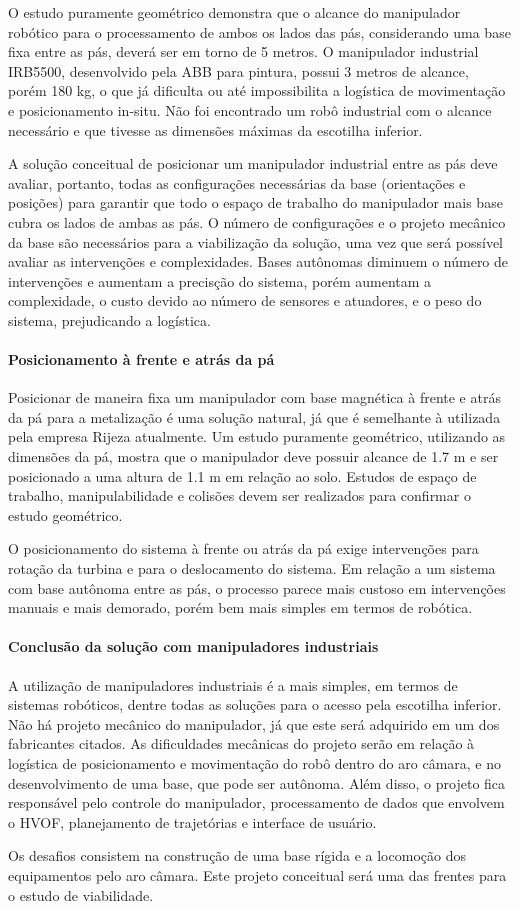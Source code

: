 O estudo puramente geométrico demonstra que o alcance do manipulador robótico
para o processamento de ambos os lados das pás, considerando uma base fixa entre
as pás, deverá ser em torno de 5 metros. O manipulador industrial IRB5500,
desenvolvido pela ABB para pintura, possui 3 metros de alcance, porém 180 kg, o que já dificulta ou até impossibilita a
logística de movimentação e posicionamento in-situ. Não foi encontrado um robô
industrial com o alcance necessário e que tivesse as dimensões máximas da
escotilha inferior. 

A solução conceitual de posicionar um manipulador industrial entre as pás deve
avaliar, portanto, todas as configurações necessárias da base (orientações e
posições) para garantir que todo o espaço de trabalho do manipulador mais base
cubra os lados de ambas as pás. O número de configurações e o projeto
mecânico da base são necessários para a viabilização da solução,
uma vez que será possível avaliar as intervenções e complexidades. Bases
autônomas diminuem o número de intervenções e aumentam a precisção do sistema,
porém aumentam a complexidade, o custo devido ao número de sensores e atuadores,
e o peso do sistema, prejudicando a logística.

\paragraph{Posicionamento à frente e atrás da pá}

Posicionar de maneira fixa um manipulador com base magnética à frente e atrás da
pá para a metalização é uma solução natural, já que é semelhante à utilizada pela
empresa Rijeza atualmente. Um estudo puramente geométrico, utilizando as
dimensões da pá, mostra que o manipulador deve possuir alcance de 1.7 m e ser
posicionado a uma altura de 1.1 m em relação ao solo. Estudos de espaço de
trabalho, manipulabilidade e colisões devem ser realizados para confirmar o
estudo geométrico.

O posicionamento do sistema à frente ou atrás da pá exige intervenções para
rotação da turbina e para o deslocamento do sistema. Em relação a um
sistema com base autônoma entre as pás, o processo parece mais custoso em
intervenções manuais e mais demorado, porém bem mais simples em termos de
robótica.

\paragraph{Conclusão da solução com manipuladores industriais}
A utilização de manipuladores industriais é a mais simples, em termos de
sistemas robóticos, dentre todas as soluções para o acesso pela escotilha
inferior.
Não há projeto mecânico do manipulador, já que este será adquirido em um dos fabricantes citados. As dificuldades mecânicas do projeto serão em relação à logística de posicionamento
e movimentação do robô dentro do aro câmara, e no desenvolvimento de uma base,
que pode ser autônoma. Além disso, o projeto fica responsável pelo controle do
manipulador, processamento de dados que envolvem o HVOF, planejamento de
trajetórias e interface de usuário.

Os desafios consistem na construção de uma base rígida e a locomoção dos
equipamentos pelo aro câmara. Este projeto conceitual será uma das frentes para
o estudo de viabilidade.
